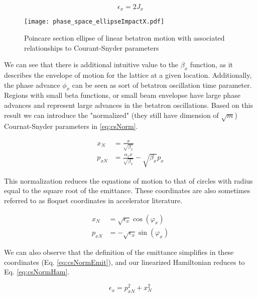 \begin{equation} \label{eq:csEmit}
	\epsilon_x = 2 J_x
\end{equation}

\begin{figure} \label{fig:csEllipse}
	\centering
	\texttt{[image: phase\_space\_ellipseImpactX.pdf]}
	\caption{Poincare section ellipse of linear betatron motion with associated relationships to Courant-Snyder parameters \cite{ImpactX}}
\end{figure}

We can see that there is additional intuitive value to the $\beta_x$ function, as it describes the envelope of motion for the lattice at a given location. Additionally, the phase advance $\phi_x$ can be seen as sort of betatron oscillation time parameter. Regions with small beta functions, or small beam envelopse have large phase advances and represent large advances in the betatron oscillations. Based on this result we can introduce the "normalized" (they still have dimension of $\sqrt{m}$) Cournat-Snyder parameters in \ref{eq:csNorm}.

\begin{equation} \label{eq:csNorm}
\begin{split}
	x_N &= \frac{x}{\sqrt{\beta_x}}\\
	p_{xN} &= \frac{\alpha_x x}{\sqrt{\beta_x}} - \sqrt{\beta_x}p_x
\end{split}
\end{equation}

This normalization reduces the equations of motion to that of circles with radius equal to the square root of the emittance. These coordinates are also sometimes referred to as floquet coordinates in accelerator literature.

\begin{equation} \label{eq:csNormVarphi}
\begin{split}
	x_N &= \sqrt{\epsilon_x} \cos{(\varphi_x)}\\
	p_{xN} &= -\sqrt{\epsilon_x} \sin{(\varphi_x)}
\end{split}
\end{equation}

We can also observe that the definition of the emittance simplifies in these coordinates (Eq. \ref{eq:csNormEmit}), and our linearized Hamiltonian reduces to Eq. \ref{eq:csNormHam}.

\begin{equation} \label{eq:csNormEmit}
	\epsilon_x = p_{xN}^2 + x_{N}^2
\end{equation}

